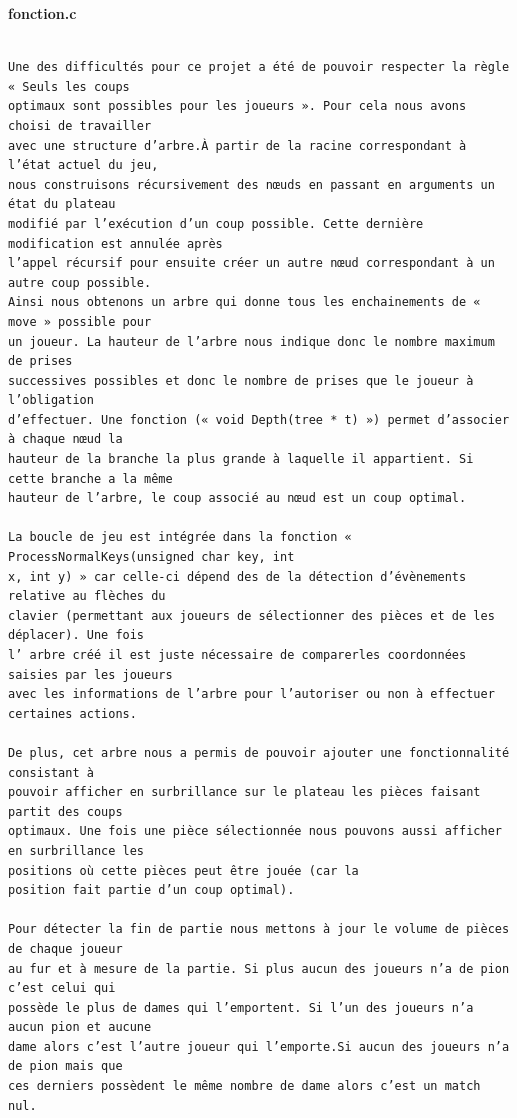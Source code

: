 \documentclass[a4paper]{article}
\begin{document}
\large\bf{fonction.c}
\begin{verbatim}

Une des difficultés pour ce projet a été de pouvoir respecter la règle « Seuls les coups 
optimaux sont possibles pour les joueurs ». Pour cela nous avons choisi de travailler 
avec une structure d’arbre.À partir de la racine correspondant à l’état actuel du jeu, 
nous construisons récursivement des nœuds en passant en arguments un état du plateau 
modifié par l’exécution d’un coup possible. Cette dernière modification est annulée après
l’appel récursif pour ensuite créer un autre nœud correspondant à un autre coup possible.
Ainsi nous obtenons un arbre qui donne tous les enchainements de « move » possible pour 
un joueur. La hauteur de l’arbre nous indique donc le nombre maximum de prises 
successives possibles et donc le nombre de prises que le joueur à l’obligation 
d’effectuer. Une fonction (« void Depth(tree * t) ») permet d’associer à chaque nœud la 
hauteur de la branche la plus grande à laquelle il appartient. Si cette branche a la même
hauteur de l’arbre, le coup associé au nœud est un coup optimal.

La boucle de jeu est intégrée dans la fonction « ProcessNormalKeys(unsigned char key, int
x, int y) » car celle-ci dépend des de la détection d’évènements relative au flèches du 
clavier (permettant aux joueurs de sélectionner des pièces et de les déplacer). Une fois 
l’ arbre créé il est juste nécessaire de comparerles coordonnées saisies par les joueurs 
avec les informations de l’arbre pour l’autoriser ou non à effectuer certaines actions.

De plus, cet arbre nous a permis de pouvoir ajouter une fonctionnalité consistant à 
pouvoir afficher en surbrillance sur le plateau les pièces faisant partit des coups 
optimaux. Une fois une pièce sélectionnée nous pouvons aussi afficher en surbrillance les
positions où cette pièces peut être jouée (car la 
position fait partie d’un coup optimal).

Pour détecter la fin de partie nous mettons à jour le volume de pièces de chaque joueur 
au fur et à mesure de la partie. Si plus aucun des joueurs n’a de pion c’est celui qui 
possède le plus de dames qui l’emportent. Si l’un des joueurs n’a aucun pion et aucune 
dame alors c’est l’autre joueur qui l’emporte.Si aucun des joueurs n’a de pion mais que 
ces derniers possèdent le même nombre de dame alors c’est un match nul.

\end{verbatim}
\end{document}
